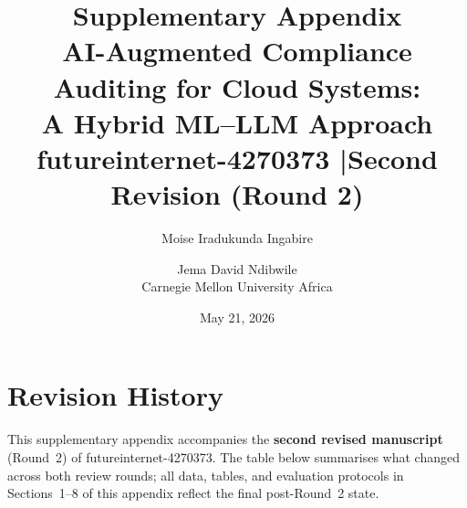 \documentclass[11pt,a4paper]{article}
\title{\textbf{Supplementary Appendix}\\
\large AI-Augmented Compliance Auditing for Cloud Systems:\\
A Hybrid ML--LLM Approach\\[4pt]
\normalsize futureinternet-4270373 \quad|\quad Second Revision (Round 2)}
\author{Moise Iradukunda Ingabire \and Jema David Ndibwile\\
Carnegie Mellon University Africa}
\date{May 21, 2026}
\begin{document}
\maketitle
\tableofcontents
\newpage

\section*{Revision History}
\label{sec:revision-history}

\noindent This supplementary appendix accompanies the \textbf{second revised manuscript}
(Round~2) of futureinternet-4270373. The table below summarises what changed across
both review rounds; all data, tables, and evaluation protocols in Sections~1--8 of this
appendix reflect the final post-Round~2 state.
\end{document}
